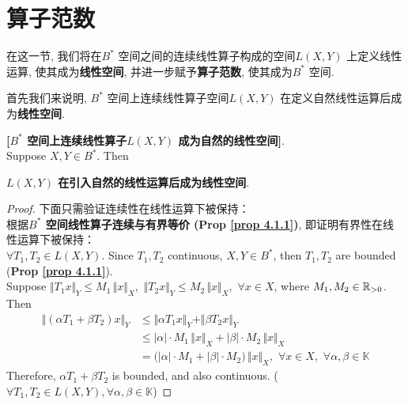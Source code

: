 \newpage

\section{算子范数}
	在这一节, 我们将在$B^*$ 空间之间的连续线性算子构成的空间$L(X , Y)$ 上定义线性运算, 使其成为\textbf{线性空间}, 并进一步赋予\textbf{算子范数}, 使其成为$B^*$ 空间. 
	
	\vspace*{1em}
	
	\hspace*{-1.95em}首先我们来说明, $B^*$ 空间上连续线性算子空间$L(X , Y)$ 在定义自然线性运算后成为\textbf{线性空间}. 
	
	\vspace*{1em}
	
	\begin{thm}\label{thm 4.2.1}
		\textbf{[$B^*$ 空间上连续线性算子$L(X , Y)$ 成为自然的线性空间]}. \\
		Suppose $X , Y \in B^*$. Then 
		\begin{center}
			\textbf{$L(X , Y)$ 在引入自然的线性运算后成为线性空间}.
		\end{center} 
		
		\vspace*{4em}
		
		\begin{proof}
			下面只需验证连续性在线性运算下被保持：\\
			根据\textbf{$B^*$ 空间线性算子连续与有界等价 (Prop \ref{prop 4.1.1})}, 即证明有界性在线性运算下被保持：\\
			$\forall T_1 , T_2 \in L(X , Y)$. Since $T_1 , T_2$ continuous, $X , Y \in B^*$, then $T_1 , T_2$ are bounded (\textbf{Prop \ref{prop 4.1.1}}). \\
			Suppose $\Vert T_1 x \Vert_Y \leq M_1 \, \Vert x \Vert_X , \,\, \Vert T_2 x \Vert_Y \leq M_2 \, \Vert x \Vert_X , \,\, \forall x \in X$, where $M_1 , M_2 \in \mathbb{R}_{> 0}$. Then
			\begin{align*}
				\Vert (\alpha T_1 + \beta T_2)x \Vert_Y 
				&\leq \Vert \alpha T_1 x \Vert_Y + \Vert \beta T_2 x \Vert_Y \\
				&\leq \left| \alpha \right| \cdot M_1 \, \Vert x \Vert_X + \left| \beta \right| \cdot M_2 \, \Vert x \Vert_X \\
				&= \Big( \left| \alpha \right| \cdot M_1 + \left| \beta \right| \cdot M_2 \Big) \, \Vert x \Vert_X , \,\, \forall x \in X , \,\, \forall \alpha , \beta \in \mathbb{K}
			\end{align*}
			Therefore, $\alpha T_1 + \beta T_2$ is bounded, and also continuous. ($\forall T_1 , T_2 \in L(X , Y) , \forall \alpha , \beta \in \mathbb{K}$)
		\end{proof}
	\end{thm}
	
